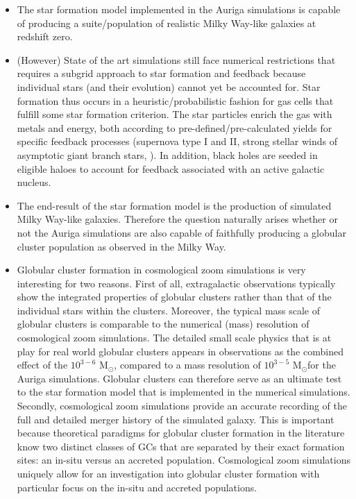 \documentclass[a4paper,fleqn,usenatbib]{mnras}
\newcommand{\Sun}[0]{\ensuremath{_{\odot}}}
\begin{document}
\begin{itemize}
    \item The star formation model implemented in the Auriga simulations is capable of producing a suite/population of realistic Milky Way-like galaxies at redshift zero.
    \item (However) State of the art simulations still face numerical restrictions that requires a subgrid approach to star formation and feedback because individual stars (and their evolution) cannot yet be accounted for. Star formation thus occurs in a heuristic/probabilistic fashion for gas cells that fulfill some star formation criterion. The star particles enrich the gas with metals and energy, both according to pre-defined/pre-calculated yields for specific feedback processes (supernova type I and II, strong stellar winds of asymptotic giant branch stars, ). In addition, black holes are seeded in eligible haloes to account for feedback associated with an active galactic nucleus.
    \item The end-result of the star formation model is the production of simulated Milky Way-like galaxies. Therefore the question naturally arises whether or not the Auriga simulations are also capable of faithfully producing a globular cluster population as observed in the Milky Way.
    \item Globular cluster formation in cosmological zoom simulations is very interesting for two reasons. First of all, extragalactic observations typically show the integrated properties of globular clusters rather than that of the individual stars within the clusters. Moreover, the typical mass scale of globular clusters is comparable to the numerical (mass) resolution of cosmological zoom simulations. The detailed small scale physics that is at play for real world globular clusters appears in observations as the combined effect of the $10^{3-6}$ M\Sun, compared to a mass resolution of $10^{3-5}$ M\Sun for the Auriga simulations. Globular clusters can therefore serve as an ultimate test to the star formation model that is implemented in the numerical simulations. Secondly, cosmological zoom simulations provide an accurate recording of the full and detailed merger history of the simulated galaxy. This is important because theoretical paradigms for globular cluster formation in the literature know two distinct classes of GCs that are separated by their exact formation sites: an in-situ versus an accreted population. Cosmological zoom simulations uniquely allow for an investigation into globular cluster formation with particular focus on the in-situ and accreted populations.
\end{itemize}
\end{document}
